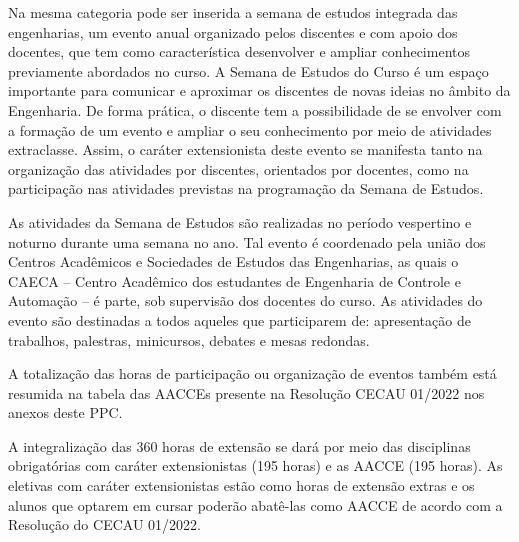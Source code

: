 \documentclass[
	12pt,				%
	openright,			%
	oneside,			%
	a4paper,			%
	english,			%
	brazil				%
	]{abntex2}
\begin{document}
Na mesma categoria pode ser inserida a semana de estudos integrada das engenharias, um evento anual organizado pelos discentes e com apoio dos docentes, que tem como característica desenvolver e ampliar conhecimentos previamente abordados no curso. A Semana de Estudos do Curso é um espaço importante para comunicar e aproximar os discentes de novas ideias no âmbito da Engenharia. De forma prática, o discente tem a possibilidade de se envolver com a formação de um evento e ampliar o seu conhecimento por meio de atividades extraclasse. Assim, o caráter extensionista deste evento se manifesta tanto na organização das atividades por discentes, orientados por docentes, como na participação nas atividades previstas na programação da Semana de Estudos.

As atividades da Semana de Estudos são realizadas no período vespertino e noturno durante uma semana no ano. Tal evento é coordenado pela união dos Centros Acadêmicos e Sociedades de Estudos das Engenharias, as quais o CAECA -- Centro Acadêmico dos estudantes de Engenharia de Controle e Automação -- é parte, sob supervisão dos docentes do curso. As atividades do evento são destinadas a todos aqueles que participarem de: apresentação de trabalhos, palestras, minicursos, debates e mesas redondas.

A totalização das horas de participação ou organização de eventos também está resumida na tabela das AACCEs presente na Resolução CECAU 01/2022 nos anexos deste PPC.

A integralização das 360 horas de extensão se dará por meio das disciplinas obrigatórias com caráter extensionistas (195 horas) e as AACCE (195 horas). As eletivas com caráter extensionistas estão como horas de extensão extras e os alunos que optarem em cursar poderão abatê-las como AACCE de acordo com a Resolução do CECAU 01/2022.
\end{document}
